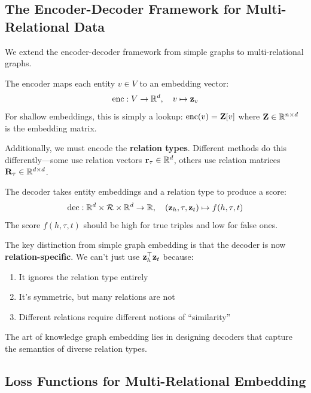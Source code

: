 \begin{notechapter}
\subsection{The Encoder-Decoder Framework for Multi-Relational Data}

We extend the encoder-decoder framework from simple graphs to multi-relational graphs.

\begin{definition}
The encoder maps each entity $v \in V$ to an embedding vector:
\[
\text{enc}: V \to \mathbb{R}^d, \quad v \mapsto \mathbf{z}_v
\]
For shallow embeddings, this is simply a lookup: $\text{enc}(v) = \mathbf{Z}[v]$ where $\mathbf{Z} \in \mathbb{R}^{n \times d}$ is the embedding matrix.

Additionally, we must encode the \textbf{relation types}. Different methods do this differently---some use relation vectors $\mathbf{r}_\tau \in \mathbb{R}^d$, others use relation matrices $\mathbf{R}_\tau \in \mathbb{R}^{d \times d}$.
\end{definition}

\begin{definition}
The decoder takes entity embeddings and a relation type to produce a score:
\[
\text{dec}: \mathbb{R}^d \times \mathcal{R} \times \mathbb{R}^d \to \mathbb{R}, \quad (\mathbf{z}_h, \tau, \mathbf{z}_t) \mapsto f(h, \tau, t)
\]
The score $f(h, \tau, t)$ should be high for true triples and low for false ones.
\end{definition}

\begin{keyinsight}
The key distinction from simple graph embedding is that the decoder is now \textbf{relation-specific}. We can't just use $\mathbf{z}_h^\top \mathbf{z}_t$ because:
\begin{enumerate}
    \item It ignores the relation type entirely
    \item It's symmetric, but many relations are not
    \item Different relations require different notions of ``similarity''
\end{enumerate}
The art of knowledge graph embedding lies in designing decoders that capture the semantics of diverse relation types.
\end{keyinsight}

\subsection{Loss Functions for Multi-Relational Embedding}


\end{notechapter}
